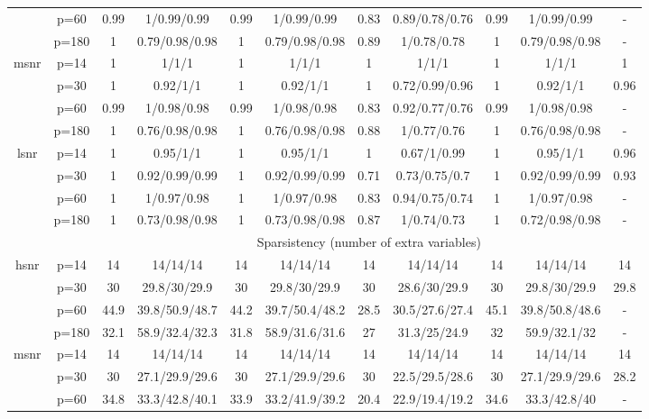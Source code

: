 \begin{table}[ht]
{\begin{tabular}{|c|c|cc|cc|cc|cc|c|}
   & p=60 & 0.99 & 1/0.99/0.99 & 0.99 & 1/0.99/0.99 & 0.83 & 0.89/0.78/0.76 & 0.99 & 1/0.99/0.99 & - \\ 
   & p=180 & 1 & 0.79/0.98/0.98 & 1 & 0.79/0.98/0.98 & 0.89 & 1/0.78/0.78 & 1 & 0.79/0.98/0.98 & - \\ 
  \midrule\multirow{4}[2]{*}{msnr} & p=14 & 1 & 1/1/1 & 1 & 1/1/1 & 1 & 1/1/1 & 1 & 1/1/1 & 1 \\ 
   & p=30 & 1 & 0.92/1/1 & 1 & 0.92/1/1 & 1 & 0.72/0.99/0.96 & 1 & 0.92/1/1 & 0.96 \\ 
   & p=60 & 0.99 & 1/0.98/0.98 & 0.99 & 1/0.98/0.98 & 0.83 & 0.92/0.77/0.76 & 0.99 & 1/0.98/0.98 & - \\ 
   & p=180 & 1 & 0.76/0.98/0.98 & 1 & 0.76/0.98/0.98 & 0.88 & 1/0.77/0.76 & 1 & 0.76/0.98/0.98 & - \\ 
  \midrule\multirow{4}[2]{*}{lsnr} & p=14 & 1 & 0.95/1/1 & 1 & 0.95/1/1 & 1 & 0.67/1/0.99 & 1 & 0.95/1/1 & 0.96 \\ 
   & p=30 & 1 & 0.92/0.99/0.99 & 1 & 0.92/0.99/0.99 & 0.71 & 0.73/0.75/0.7 & 1 & 0.92/0.99/0.99 & 0.93 \\ 
   & p=60 & 1 & 1/0.97/0.98 & 1 & 1/0.97/0.98 & 0.83 & 0.94/0.75/0.74 & 1 & 1/0.97/0.98 & - \\ 
   & p=180 & 1 & 0.73/0.98/0.98 & 1 & 0.73/0.98/0.98 & 0.87 & 1/0.74/0.73 & 1 & 0.72/0.98/0.98 & - \\ 
   \midrule 
 \multicolumn{1}{|c}{} &       & \multicolumn{9}{c|}{Sparsistency (number of extra variables)} \\
\midrule\multirow{4}[2]{*}{hsnr} & p=14 & 14 & 14/14/14 & 14 & 14/14/14 & 14 & 14/14/14 & 14 & 14/14/14 & 14 \\ 
   & p=30 & 30 & 29.8/30/29.9 & 30 & 29.8/30/29.9 & 30 & 28.6/30/29.9 & 30 & 29.8/30/29.9 & 29.8 \\ 
   & p=60 & 44.9 & 39.8/50.9/48.7 & 44.2 & 39.7/50.4/48.2 & 28.5 & 30.5/27.6/27.4 & 45.1 & 39.8/50.8/48.6 & - \\ 
   & p=180 & 32.1 & 58.9/32.4/32.3 & 31.8 & 58.9/31.6/31.6 & 27 & 31.3/25/24.9 & 32 & 59.9/32.1/32 & - \\ 
  \midrule\multirow{4}[2]{*}{msnr} & p=14 & 14 & 14/14/14 & 14 & 14/14/14 & 14 & 14/14/14 & 14 & 14/14/14 & 14 \\ 
   & p=30 & 30 & 27.1/29.9/29.6 & 30 & 27.1/29.9/29.6 & 30 & 22.5/29.5/28.6 & 30 & 27.1/29.9/29.6 & 28.2 \\ 
   & p=60 & 34.8 & 33.3/42.8/40.1 & 33.9 & 33.2/41.9/39.2 & 20.4 & 22.9/19.4/19.2 & 34.6 & 33.3/42.8/40 & - \\ 

\end{tabular}}
\end{table}
